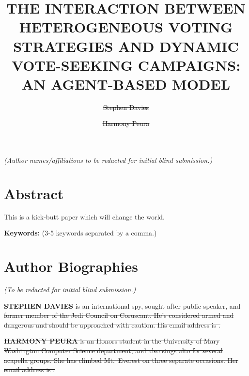 \documentclass{scspaperproc}
\begin{document}

\def\SCSconferencename{Annual Simulation Conference}

\def\SCSconferenceacro{ANNSIM'24}

\def\SCSpublicationyear{2024}

\def\SCSconferenceeditors{P.J. Giabbanelli, I. David, C. Ruiz-Martin, B. Oakes and R. C\'{a}rdenas}

\def\SCSconferencedates{May 20-23}

\def\SCSconferencevenue{American University, DC, USA}

\title{THE INTERACTION BETWEEN HETEROGENEOUS VOTING STRATEGIES AND DYNAMIC
VOTE-SEEKING CAMPAIGNS: AN AGENT-BASED MODEL}

\textit{(Author names/affiliations to be redacted for initial blind submission.)}
\author[\authorrefmark{1}]{\sout{Stephen Davies}}
\author[\authorrefmark{1}]{\sout{Harmony Peura}}



\maketitle

\section*{Abstract}

This is a kick-butt paper which will change the world.


\textbf{Keywords:} (3-5 keywords separated by a comma.)

















\section*{Author Biographies}

\textit{(To be redacted for initial blind submission.)}

\sout{\textbf{\uppercase{Stephen Davies}} is an international spy, sought-after
public speaker, and former member of the Jedi Council on Coruscant. He's
considered armed and dangerous and should be approached with caution.
His email address is .}

\sout{\textbf{\uppercase{Harmony Peura}} is an Honors student in the University of
Mary Washington Computer Science department, and also sings alto for several
acapella groups. She has climbed Mt.~Everest on three separate occasions. Her
email address is .}
\end{document}
